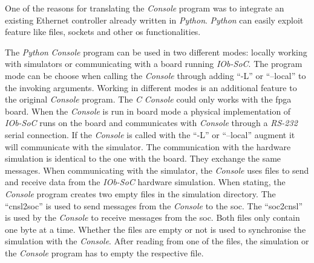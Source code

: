 One of the reasons for translating the \textit{Console} program was to integrate an existing Ethernet controller already written in \textit{Python}. \textit{Python} can easily exploit feature like files, sockets and other \acrfull{os} functionalities.

The \textit{Python} \textit{Console} program can be used in two different modes: locally working with simulators or communicating with a board running \textit{IOb-SoC}. The program mode can be choose when calling the \textit{Console} through adding \enquote{-L} or \enquote{--local} to the invoking arguments. Working in different modes is an additional feature to the original \textit{Console} program. The \textit{C} \textit{Console} could only works with the \acrshort{fpga} board. When the \textit{Console} is run in board mode a physical implementation of \textit{IOb-SoC} runs on the board and communicates with \textit{Console} through a \textit{RS-232} serial connection. If the \textit{Console} is called with the \enquote{-L} or \enquote{--local} augment it will communicate with the simulator. The communication with the hardware simulation is identical to the one with the board. They exchange the same messages. When communicating with the simulator, the \textit{Console} uses files to send and receive data from the \textit{IOb-SoC} hardware simulation. When stating, the \textit{Console} program creates two empty files in the simulation directory. The \enquote{cnsl2soc} is used to send messages from the \textit{Console} to the \acrshort{soc}. The \enquote{soc2cnsl} is used by the \textit{Console} to receive messages from the \acrshort{soc}. Both files only contain one byte at a time. Whether the files are empty or not is used to synchronise the simulation with the \textit{Console}. After reading from one of the files, the simulation or the \textit{Console} program has to empty the respective file.

